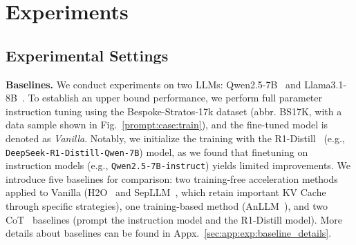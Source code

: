 \section{Experiments}

\subsection{Experimental Settings}




\textbf{Baselines.}
We conduct experiments on two LLMs: Qwen2.5-7B~\citep{arxiv24_qwen2_5} and Llama3.1-8B~\citep{arxiv24_llama_3}.
To establish an upper bound performance, we perform full parameter instruction tuning using the Bespoke-Stratos-17k dataset (abbr. BS17K, with a data sample shown in Fig.~\ref{prompt:case:train}), and the fine-tuned model is denoted as \textit{Vanilla}.  
Notably, we initialize the training with the R1-Distill~\citep{arxiv25_deepseek_r1} (e.g., \texttt{DeepSeek-R1-Distill-Qwen-7B}) model, as we found that finetuning on instruction models (e.g., \texttt{Qwen2.5-7B-instruct}) yields limited improvements.
We introduce five baselines for comparison: 
two training-free acceleration methods applied to Vanilla (H2O~\citep{nips23_h2o} and SepLLM~\citep{arxiv24_sepllm}, which retain important KV Cache through specific strategies), 
one training-based method (AnLLM~\citep{acl24_anllm}), 
and two CoT~\citep{nips22_cot} baselines (prompt the instruction model and the R1-Distill model). 
More details about baselines can be found in Appx.~\ref{sec:app:exp:baseline_details}.  

